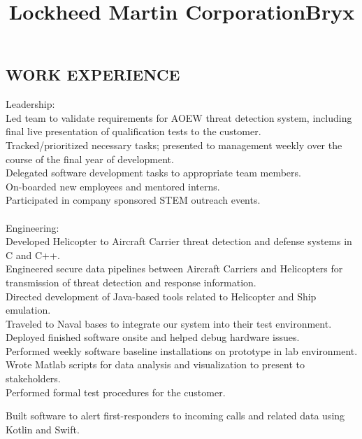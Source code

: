 \documentclass[line,margin]{res}
\begin{document}
\begin{resume}
\section{WORK EXPERIENCE}
\title{\textbf{Lockheed Martin Corporation}}
\begin{position} 
    Leadership:\\
    Led team to validate requirements for AOEW threat detection system, including final live presentation of qualification tests to the customer. \\ 
    Tracked/prioritized necessary tasks; presented to management weekly over the course of the final year of development. \\
    Delegated software development tasks to appropriate team members. \\
    On-boarded new employees and mentored interns. \\
    Participated in company sponsored STEM outreach events.\\
    \\
    Engineering:\\
    Developed Helicopter to Aircraft Carrier threat detection and defense systems in C and C++.\\
    Engineered secure data pipelines between Aircraft Carriers and Helicopters for transmission of threat detection and response information.\\
    Directed development of Java-based tools related to Helicopter and Ship emulation.\\
    Traveled to Naval bases to integrate our system into their test environment.\\
    Deployed finished software onsite and helped debug hardware issues.\\
    Performed weekly software baseline installations on prototype in lab environment.\\
    Wrote Matlab scripts for data analysis and visualization to present to stakeholders. \\
    Performed formal test procedures for the customer.
\end{position}
\title{\textbf{Bryx}}
\begin{position}
    Built software to alert first-responders to incoming calls and related data using Kotlin and Swift.\\

\end{position}
\end{resume}
\end{document}
